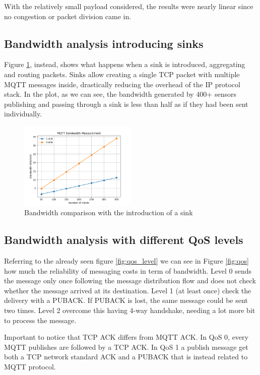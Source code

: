 \documentclass[journal]{IEEEtran}
\begin{document}
With the relatively small payload considered, the results were nearly linear since no congestion or packet division came in. 

\subsection{Bandwidth analysis introducing sinks}
Figure \ref{fig:sinks}, instead, shows what happens when a sink is introduced, aggregating and routing packets. Sinks allow creating a single TCP packet with multiple MQTT messages inside, drastically reducing the overhead of the IP protocol stack. In the plot, as we can see, the bandwidth generated by 400+ sensors publishing and passing through a sink is less than half as if they had been sent individually.
\begin{figure}[h]
	\centering
	\includegraphics[width=0.50\textwidth]{sinks}
	\caption{Bandwidth comparison with the introduction of a sink}
	\label{fig:sinks}
\end{figure}

\subsection{Bandwidth analysis with different QoS levels}
Referring to the already seen figure \ref{fig:qos_level} we can see in Figure \ref{fig:qos} how much the reliability of messaging costs in term of bandwidth. Level 0 sends the message only once following the message
distribution flow and does not check whether the message
arrived at its destination. Level 1 (at least once) check the delivery with a PUBACK. If PUBACK is lost, the same message could be sent two times. Level 2 overcome this having 4-way handshake, needing a lot more bit to process the message. 

Important to notice that TCP ACK differs from MQTT ACK. In QoS 0, every MQTT publishes are followed by a TCP ACK. In QoS 1 a publish message get both a TCP network standard ACK and a PUBACK that is instead related to MQTT protocol. 
\end{document}
